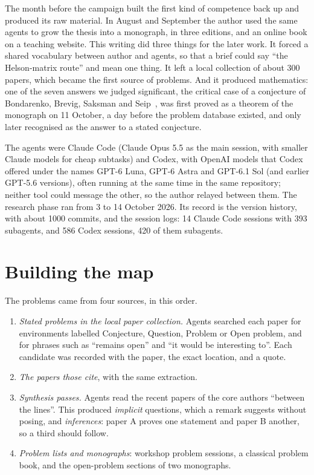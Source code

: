 \documentclass[11pt]{amsart}
\newcommand*{\sectionbreak}{\clearpage} %
\begin{document}
The month before the campaign built the first kind of competence back up and
produced its raw material. In August and September the author used the same
agents to grow the thesis into a monograph, in three editions, and an online
book on a teaching website. This writing did three things for the later work.
It forced a shared vocabulary between author and agents, so that a brief could
say ``the Helson-matrix route'' and mean one thing. It left a local collection
of about 300 papers, which became the first source of problems. And it produced
mathematics: one of the seven answers we judged significant, the critical case
of a conjecture of Bondarenko, Brevig, Saksman and Seip~\cite{bbss}, was first
proved as a theorem of the monograph on 11 October, a day before the problem
database existed, and only later recognised as the answer to a stated
conjecture.

The agents were Claude Code (Claude Opus 5.5 as the main session, with smaller
Claude models for cheap subtasks) and Codex, with OpenAI models that Codex
offered under the names GPT-6 Luna, GPT-6 Astra and GPT-6.1 Sol (and earlier
GPT-5.6 versions), often running at the same time in the same repository;
neither tool could message the other, so the author relayed between them. The
research phase ran from 3 to 14 October 2026. Its record is the version
history, with about 1000 commits, and the session logs: 14 Claude Code sessions
with 393 subagents, and 586 Codex sessions, 420 of them subagents.

\sectionbreak
\section{Building the map}\label{sec:map}

The problems came from four sources, in this order.
\begin{enumerate}
  \item \emph{Stated problems in the local paper collection.} Agents searched
        each paper for environments labelled Conjecture, Question, Problem or
        Open problem, and for phrases such as ``remains open'' and ``it would be
        interesting to''. Each candidate was recorded with the paper, the exact
        location, and a quote.
  \item \emph{The papers those cite}, with the same extraction.
  \item \emph{Synthesis passes.} Agents read the recent papers of the core
        authors ``between the lines''. This produced \emph{implicit} questions,
        which a remark suggests without posing, and \emph{inferences}: paper A
        proves one statement and paper B another, so a third should follow.
  \item \emph{Problem lists and monographs}: workshop problem sessions, a
        classical problem book, and the open-problem sections of two monographs.
\end{enumerate}
\end{document}

